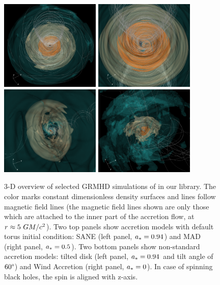 \begin{figure}
  \centering
  \includegraphics[width=0.425\textwidth]{figures/sane_3D_final.png}\hspace{1.5pt}%
  \includegraphics[width=0.425\textwidth]{figures/mad_3D_final.png}\\
  \includegraphics[width=0.425\textwidth]{figures/tilted_3D_final.png}\hspace{1.5pt}%
  \includegraphics[width=0.425\textwidth]{figures/ressler_3D_final.png}
  \caption{3-D overview of selected GRMHD simulations of \sgra in our library.
    The color marks constant dimensionless density surfaces and lines follow magnetic field lines (the magnetic field lines shown are only those which are attached to the inner part of the accretion flow, at $r\approx 5~GM/c^2$).
    Two top panels show accretion models with default torus initial condition: SANE (left panel, $a_*=0.94$) and MAD (right panel, $a_*=0.5$).
    Two bottom panels show non-standard accretion models: tilted disk (left panel, $a_*=0.94$ and tilt angle of $60\degree$) and Wind Accretion (right panel, $a_*=0$).
    In case of spinning black holes, the spin is aligned with z-axis.}
  \label{fig:GRMHD}
\end{figure}

